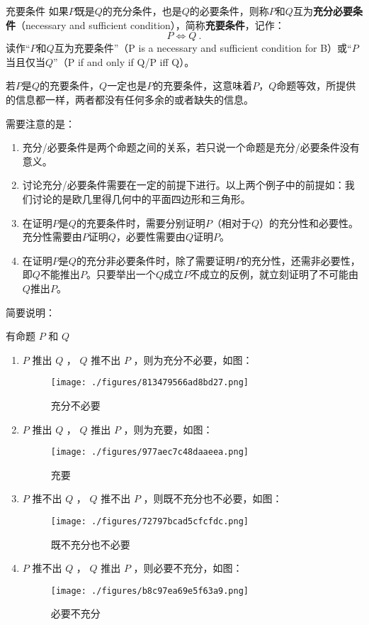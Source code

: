 \begin{definition}{充要条件}
如果$P$既是$Q$的充分条件，也是$Q$的必要条件，则称$P$和$Q$互为\textbf{充分必要条件}（necessary and sufficient condition），简称\textbf{充要条件}，记作：
\begin{equation}
P\Leftrightarrow Q~.
\end{equation}
读作“$P$和$Q$互为充要条件”（P is a necessary and sufficient condition for B）或“$P$当且仅当$Q$”（P if and only if Q/P iff Q）。
\end{definition}

若$P$是$Q$的充要条件，$Q$一定也是$P$的充要条件，这意味着$P$，$Q$命题等效，所提供的信息都一样，两者都没有任何多余的或者缺失的信息。

需要注意的是：
\begin{enumerate}
\item 充分/必要条件是两个命题之间的关系，若只说一个命题是充分/必要条件没有意义。
\item 讨论充分/必要条件需要在一定的前提下进行。以上两个例子中的前提如：我们讨论的是欧几里得几何中的平面四边形和三角形。
\item 在证明$P$是$Q$的充要条件时，需要分别证明$P$（相对于$Q$）的充分性和必要性。充分性需要由$P$证明$Q$，必要性需要由$Q$证明$P$。
\item 在证明$P$是$Q$的充分非必要条件时，除了需要证明$P$的充分性，还需非必要性，即$Q$不能推出$P$。只要举出一个$Q$成立$P$不成立的反例，就立刻证明了不可能由$Q$推出$P$。
\end{enumerate}

简要说明：

有命题 $P$ 和 $Q$ 
\begin{enumerate}
\item $P$ 推出 $Q$ ， $Q$ 推不出 $P$ ，则为充分不必要，如图：
\begin{figure}[ht]
\centering
\texttt{[image: ./figures/813479566ad8bd27.png]}
\caption{充分不必要} \label{fig_SufCnd_2}
\end{figure}

\item $P$ 推出 $Q$ ， $Q$ 推出 $P$ ，则为充要，如图：\begin{figure}[ht]
\centering
\texttt{[image: ./figures/977aec7c48daaeea.png]}
\caption{充要} \label{fig_SufCnd_3}
\end{figure}
\item $P$ 推不出 $Q$ ， $Q$ 推不出 $P$ ，则既不充分也不必要，如图：\begin{figure}[ht]
\centering
\texttt{[image: ./figures/72797bcad5cfcfdc.png]}
\caption{既不充分也不必要} \label{fig_SufCnd_4}
\end{figure}
\item $P$ 推不出 $Q$ ， $Q$ 推出 $P$ ，则必要不充分，如图：\begin{figure}[ht]
\centering
\texttt{[image: ./figures/b8c97ea69e5f63a9.png]}
\caption{必要不充分} \label{fig_SufCnd_5}
\end{figure}
\end {enumerate}

